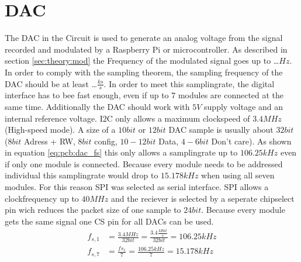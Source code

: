 \section{DAC}
%
%
The DAC in the Circuit is used to generate an analog voltage from the signal recorded and modulated by a Raspberry Pi or microcontroller.\p
%
As described in section \ref{sec:theory:mod} the Frequency of the modulated signal goes up to \dots$Hz$.
In order to comply with the sampling theorem, the sampling frequency of the DAC should be at least \dots$\frac{ks}{s}$. In order to meet this samplingrate, the digital interface has to bee fast enough, even if up to 7 modules are connected at the same time. Additionally the DAC should work with $5V$ supply voltage and an internal reference voltage.\p
%
I2C only allows a maximum clockspeed of $3.4MHz$ (High-speed mode). A size of a $10bit$ or $12bit$ DAC sample is usually about $32bit$ ($8bit$ Adress + RW, $8bit$ config, $10 - 12bit$ Data, $4 - 6bit$ Don't care). As shown in equation \ref{eq:pcb:dac_fs} this only allows a samplingrate up to $106.25kHz$ even if only one module is connected. Because every module needs to be addressed individual this samplingrate would drop to $15.178kHz$ when using all seven modules. For this reason SPI was selected as serial interface. SPI allows a clockfrequency up to $40MHz$ and the reciever is selected by a seperate chipselect pin wich reduces the packet size of one sample to $24bit$. Because every module gets the same signal one CS pin for all DACs can be used.\p
%
%
\begin{align}
  f_{s,1} &= \frac{3.4MHz}{32bit} = \frac{3.4 \frac{Mbit}{s}}{32bit} = 106.25kHz \label{eq:pcb:dac_fs}\\[1em]
  f_{s, 7} &= \frac{fs_1}{7} = \frac{106.25kHz}{7} = 15.178kHz
\end{align}
